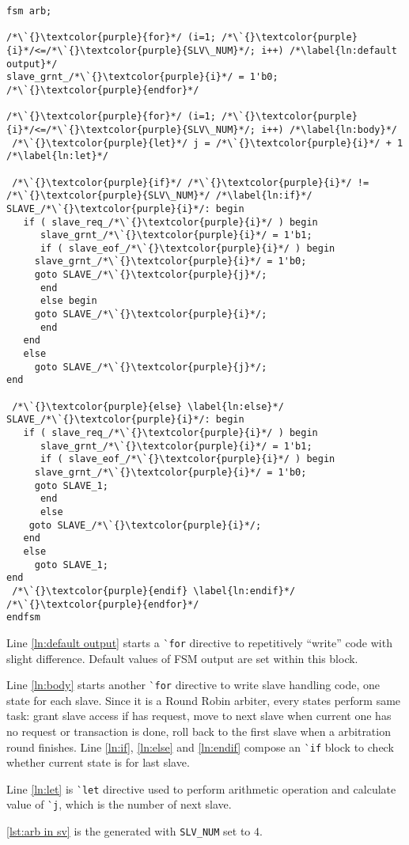 \begin{minipage}[t]{.45\textwidth}
\begin{lstlisting}[caption={Configurable Arbiter}, label={lst:arb in pp}]
fsm arb; 

/*\`{}\textcolor{purple}{for}*/ (i=1; /*\`{}\textcolor{purple}{i}*/<=/*\`{}\textcolor{purple}{SLV\_NUM}*/; i++) /*\label{ln:default output}*/
slave_grnt_/*\`{}\textcolor{purple}{i}*/ = 1'b0;
/*\`{}\textcolor{purple}{endfor}*/

/*\`{}\textcolor{purple}{for}*/ (i=1; /*\`{}\textcolor{purple}{i}*/<=/*\`{}\textcolor{purple}{SLV\_NUM}*/; i++) /*\label{ln:body}*/
 /*\`{}\textcolor{purple}{let}*/ j = /*\`{}\textcolor{purple}{i}*/ + 1 /*\label{ln:let}*/

 /*\`{}\textcolor{purple}{if}*/ /*\`{}\textcolor{purple}{i}*/ != /*\`{}\textcolor{purple}{SLV\_NUM}*/ /*\label{ln:if}*/
SLAVE_/*\`{}\textcolor{purple}{i}*/: begin
   if ( slave_req_/*\`{}\textcolor{purple}{i}*/ ) begin
      slave_grnt_/*\`{}\textcolor{purple}{i}*/ = 1'b1;
      if ( slave_eof_/*\`{}\textcolor{purple}{i}*/ ) begin
	 slave_grnt_/*\`{}\textcolor{purple}{i}*/ = 1'b0;
	 goto SLAVE_/*\`{}\textcolor{purple}{j}*/;
      end
      else begin
	 goto SLAVE_/*\`{}\textcolor{purple}{i}*/;
      end
   end
   else 
     goto SLAVE_/*\`{}\textcolor{purple}{j}*/;
end

 /*\`{}\textcolor{purple}{else} \label{ln:else}*/ 
SLAVE_/*\`{}\textcolor{purple}{i}*/: begin 
   if ( slave_req_/*\`{}\textcolor{purple}{i}*/ ) begin
      slave_grnt_/*\`{}\textcolor{purple}{i}*/ = 1'b1;
      if ( slave_eof_/*\`{}\textcolor{purple}{i}*/ ) begin
	 slave_grnt_/*\`{}\textcolor{purple}{i}*/ = 1'b0;
	 goto SLAVE_1;
      end
      else 
	goto SLAVE_/*\`{}\textcolor{purple}{i}*/;
   end
   else 
     goto SLAVE_1;
end  
 /*\`{}\textcolor{purple}{endif} \label{ln:endif}*/
/*\`{}\textcolor{purple}{endfor}*/
endfsm
\end{lstlisting}
\end{minipage}
\begin{minipage}[t]{.5\textwidth}
\vspace{2ex}
Line \autoref{ln:default output} starts a \`{}\texttt{for} directive to repetitively 
``write'' code with slight difference. Default values of FSM output are set within 
this block. 

Line \autoref{ln:body} starts another \`{}\texttt{for} directive to write slave handling
code, one state for each slave. 
Since it is a Round Robin arbiter, every states perform same task: grant slave access if
has request, move to next slave when current one has no request or transaction is done, 
roll back to the first slave when a arbitration round finishes. Line \autoref{ln:if}, 
\autoref{ln:else} and \autoref{ln:endif} compose an \`{}\texttt{if} block to check
whether current state is for last slave. 

Line \autoref{ln:let} is \`{}\texttt{let} directive used to perform arithmetic operation 
and calculate value of \`{}\texttt{j}, which is the number of next slave.

\autoref{lst:arb in sv} is the generated \sv{} with \texttt{SLV\_NUM} set to $4$. 
\end{minipage}


